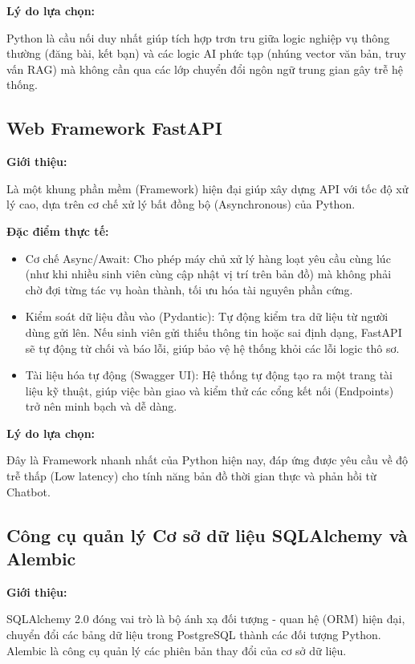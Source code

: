 \textbf{Lý do lựa chọn:} 

Python là cầu nối duy nhất giúp tích hợp trơn tru giữa logic nghiệp vụ thông thường (đăng bài, kết bạn) và các logic AI phức tạp (nhúng vector văn bản, truy vấn RAG) mà không cần qua các lớp chuyển đổi ngôn ngữ trung gian gây trễ hệ thống.

\subsection{Web Framework FastAPI}

\textbf{Giới thiệu:} 

Là một khung phần mềm (Framework) hiện đại giúp xây dựng API với tốc độ xử lý cao, dựa trên cơ chế xử lý bất đồng bộ (Asynchronous) của Python\cite{tiangolo2018fastapi, amorim2024building}.

\textbf{Đặc điểm thực tế:}

\begin{itemize}
    \item Cơ chế Async/Await: Cho phép máy chủ xử lý hàng loạt yêu cầu cùng lúc (như khi nhiều sinh viên cùng cập nhật vị trí trên bản đồ) mà không phải chờ đợi từng tác vụ hoàn thành, tối ưu hóa tài nguyên phần cứng.

    \item Kiểm soát dữ liệu đầu vào (Pydantic): Tự động kiểm tra dữ liệu từ người dùng gửi lên. Nếu sinh viên gửi thiếu thông tin hoặc sai định dạng, FastAPI sẽ tự động từ chối và báo lỗi, giúp bảo vệ hệ thống khỏi các lỗi logic thô sơ.
    
    \item Tài liệu hóa tự động (Swagger UI): Hệ thống tự động tạo ra một trang tài liệu kỹ thuật, giúp việc bàn giao và kiểm thử các cổng kết nối (Endpoints) trở nên minh bạch và dễ dàng.
\end{itemize}

\textbf{Lý do lựa chọn:} 

Đây là Framework nhanh nhất của Python hiện nay, đáp ứng được yêu cầu về độ trễ thấp (Low latency) cho tính năng bản đồ thời gian thực và phản hồi từ Chatbot.

\subsection{Công cụ quản lý Cơ sở dữ liệu SQLAlchemy và Alembic}

\textbf{Giới thiệu:} 

SQLAlchemy 2.0 đóng vai trò là bộ ánh xạ đối tượng - quan hệ (ORM) hiện đại\cite{sqlalchemy2023}, chuyển đổi các bảng dữ liệu trong PostgreSQL thành các đối tượng Python. Alembic là công cụ quản lý các phiên bản thay đổi của cơ sở dữ liệu.

